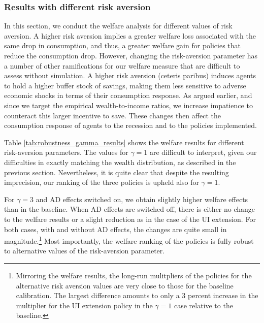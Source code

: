 \documentclass[\econtexRoot/HAFiscal]{subfiles}
\begin{document}
\subsubsection{Results with different risk aversion}
\notinsubfile{\label{sec:robust_gamma_results}}

In this section, we conduct the welfare analysis for different values of risk aversion. A higher risk aversion implies a greater welfare loss associated with the same drop in consumption, and thus, a greater welfare gain for policies that reduce the consumption drop. However, changing the risk-aversion parameter has a number of other ramifications for our welfare measure that are difficult to assess without simulation. A higher risk aversion (ceteris paribus) induces agents to hold a higher buffer stock of savings, making them less sensitive to adverse economic shocks in terms of their consumption response. As argued earlier, and since we target the empirical wealth-to-income ratios, we increase impatience to counteract this larger incentive to save. These changes then affect the consumption response of agents to the recession and to the policies implemented. 

Table \ref{tab:robustness_gamma_results} shows the welfare results for different risk-aversion parameters. The values for $\gamma = 1$ are difficult to interpret, given our difficulties in exactly matching the wealth distribution, as described in the previous section. Nevertheless, it is quite clear that despite the resulting imprecision, our ranking of the three policies is upheld also for $\gamma=1$.

For $\gamma=3$ and AD effects switched on, we obtain slightly higher welfare effects than in the baseline. When AD effects are switched off, there is either no change to the welfare results or a slight reduction as in the case of the UI extension. For both cases, with and without AD effects, the changes are quite small in magnitude.\footnote{Mirroring the welfare results, the long-run mulitpliers of the policies for the alternative risk aversion values are very close to those for the baseline calibration. The largest difference amounts to only a 3 percent increase in the multiplier for the UI extension policy in the $\gamma = 1$ case relative to the baseline.} Most importantly, the welfare ranking of the policies is fully robust to alternative values of the risk-aversion parameter.
\end{document}

